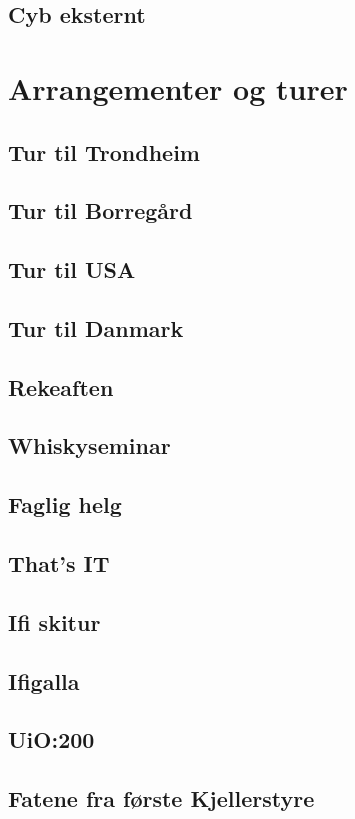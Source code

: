 \documentclass[12pt, a4paper]{book}
\begin{document}
\chapter{Cyb eksternt}

\part{Arrangementer og turer}
\chapter{Tur til Trondheim}
\chapter{Tur til Borregård}
\chapter{Tur til USA}
\chapter{Tur til Danmark}
\chapter{Rekeaften}
\chapter{Whiskyseminar}
\chapter{Faglig helg}
\chapter{That's IT}
\chapter{Ifi skitur}
\chapter{Ifigalla}
\chapter{UiO:200}
\chapter{Fatene fra første Kjellerstyre}
\end{document}
